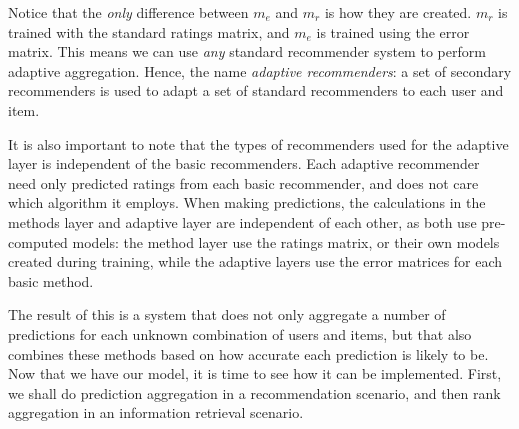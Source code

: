 Notice that the \emph{only} difference between $m_e$ and $m_r$ is how they are created.
$m_r$ is trained with the standard ratings matrix, and $m_e$ is trained using the error matrix.
This means we can use \emph{any} standard recommender system to perform adaptive aggregation.
Hence, the name \emph{adaptive recommenders}:
a set of secondary recommenders is used to adapt a set of standard
recommenders to each user and item.

It is also important to note that the types of recommenders used for the adaptive layer
is independent of the basic recommenders.
Each adaptive recommender need only predicted ratings from each basic recommender,
and does not care which algorithm it employs.
When making predictions, the calculations in the methods layer and adaptive layer
are independent of each other, as both use pre-computed models:
the method layer use the ratings matrix, or their own models
created during training, while the adaptive layers use the error matrices for each
basic method.

The result of this is a system that does not only aggregate a number of predictions for each unknown
combination of users and items,
but that also combines these methods based on how accurate each prediction is likely to be.
Now that we have our model, it is time to see how it can be implemented.
First, we shall do prediction aggregation in a recommendation scenario,
and then rank aggregation in an information retrieval scenario.

